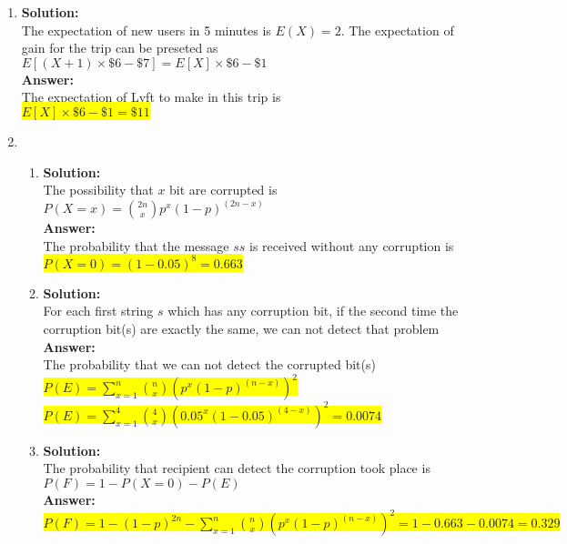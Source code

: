 \documentclass{article}
\newcommand{\myansw}{\textbf{Answer:}\\}
\newcommand{\mysolu}{\textbf{Solution:}\\}
\begin{document}
\begin{enumerate}
	\item
	\mysolu
	The expectation of new users in 5 minutes is ${E(X) = 2}$.
	The expectation of gain for the trip can be preseted as\\
	${E[(X+1) \times \$6 - \$7]=E[X]\times \$6 -\$1}$\\
	\myansw
	The expectation of Lyft to make in this trip is\\
	\colorbox{yellow}{
		${E[X] \times \$ 6 - \$1 = \$11}$
	}\\
	\item
	\begin{enumerate}
		\item
		\mysolu
		The possibility that ${x}$ bit are corrupted is\\
		${P(X=x)={2n \choose x}p^x(1-p)^{(2n-x)}}$\\
		\myansw
		The probability that the message ${ss}$ is received without any corruption is\\
		\colorbox{yellow}{${P(X=0)=(1-0.05)^8=0.663}$}\\
		\item 
		\mysolu
		For each first string ${s}$ which has any corruption bit, if the second time the corruption bit(s) are exactly the same, we can not detect that problem\\
		\myansw
		The probability that we can not detect the corrupted bit(s)\\
		\colorbox{yellow}{$P(E) = \sum\limits_{x = 1}^n {n \choose x}(p^x(1-p)^{(n-x)})^2$}\\
		\colorbox{yellow}{${P(E) = \sum\limits_{x = 1}^4 {4 \choose x}(0.05^x(1-0.05)^{(4-x)})^2=0.0074}$}\\
		\item
		\mysolu
		The probability that recipient can detect the corruption took place is\\
		${P(F) = 1 - P(X=0) - P(E)}$\\
		\myansw
		\colorbox{yellow}{${P(F) = 1 - (1-p)^{2n} - \sum\limits_{x = 1}^n {n \choose x}(p^x(1-p)^{(n-x)})^2 = 1 - 0.663 - 0.0074 = 0.329}$}\\
		


\end{enumerate}
\end{enumerate}
\end{document}
